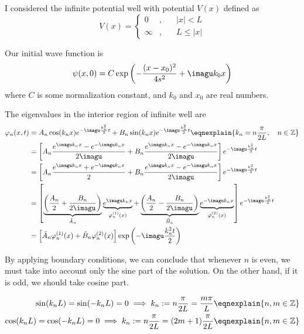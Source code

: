 \documentclass[12pt]{article}
\begin{document}
I considered the infinite potential well with potential $V(x)$ defined as \begin{equation}
V(x) = \left\{\begin{matrix}
0 & ,&\quad |x| < L \\ \infty & ,& \quad  L \leq |x| 
\end{matrix}\right.
\end{equation}

Our initial wave function is\begin{equation}
\psi(x,0) = C \exp\left(-\frac{(x-x_0)^2}{4s^2} + \imagu k_0 x\right)
\end{equation}
where $C$ is some normalization constant, and $k_0$ and $x_0$ are real numbers.

The eigenvalues in the interior region of infinite well are\begin{align}
\varphi_n(x , t) &= A_n \cos(k_nx)e^{-\imagu \frac{k_n^2}{2} t} + B_n\sin(k_nx) e^{-\imagu \frac{k_n^2}{2} t} \eqnexplain{k_n = n\frac{\pi}{2L},\quad n \in \mathbb{Z}} \\
& = \left[A_n \frac{e^{\imagu k_nx}- e^{-\imagu k_n x} }{2\imagu}+ B_n \frac{e^{\imagu k_nx}- e^{-\imagu k_n x} }{2\imagu} \right]e^{-\imagu \frac{k_n^2}{2} t} \\ 
& = \left[A_n \frac{e^{\imagu k_nx}+e^{-\imagu k_n x} }{2}+ B_n \frac{e^{\imagu k_nx}- e^{-\imagu k_n x} }{2\imagu} \right]e^{-\imagu \frac{k_n^2}{2} t} \\ 
& = \left[\underbrace{\left(\frac{A_n}{2}+\frac{B_n}{2\imagu}\right)}_{\tilde A_n} \underbrace{e^{\imagu k_nx}}_{\varphi_n^{(1)}(x)} + \underbrace{\left(\frac{A_n}{2}-\frac{B_n}{2\imagu}\right)}_{\tilde B_n} \underbrace{e^{-\imagu k_nx}}_{\varphi_n^{(2)}(x)} \right]e^{-\imagu \frac{k_n^2}{2} t} \\ 
& = \left[\tilde A_n \varphi_n^{(1)}(x) + \tilde B_n \varphi_n^{(2)}(x)\right] \exp\left(- \imagu \frac{k_n^2t}{2}\right)
\end{align}

By applying boundary conditions, we can conclude that whenever $n$ is even, we must take into account only the sine part of the solution. On the other hand, if it is odd, we should take cosine part.

\begin{align}
\sin(k_nL) = \sin(-k_nL) = 0 \implies k_n := n\frac{\pi}{2L} = \frac{m\pi}{L}\eqnexplain{n,m\in \mathbb Z} \\ 
\cos(k_nL) = \cos(-k_nL) = 0 \implies k_n := n\frac{\pi}{2L} = (2m+1)\frac{\pi}{2L} \eqnexplain{n,m\in \mathbb Z}
\end{align}
\end{document}
